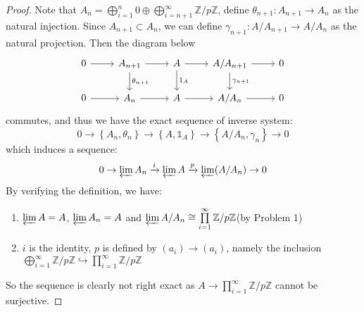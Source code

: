 \documentclass{solution}
\begin{document}
\begin{proof}
    Note that $A_n = \bigoplus\limits_{i = 1}^{n} 0 \oplus \bigoplus\limits_{i = n + 1}^{\infty} \mathbb{Z} / p \mathbb{Z}$, define $\theta_{n + 1}: A_{n + 1} \rightarrow A_n$ as the natural injection. Since $A_{n + 1} \subset A_n$, we can define $\gamma_{n + 1}: A / A_{n + 1} \rightarrow A / A_n$ as the natural projection. Then the diagram below
    \[\begin{tikzcd}
        0 & {A_{n + 1}} & A & {A / A_{n + 1}} & 0 \\
        0 & {A_n} & A & {A / A_n} & 0
        \arrow[from=1-1, to=1-2]
        \arrow[from=1-2, to=1-3]
        \arrow["{\theta_{n + 1}}", from=1-2, to=2-2]
        \arrow[from=1-3, to=1-4]
        \arrow["{1_A}", from=1-3, to=2-3]
        \arrow[from=1-4, to=1-5]
        \arrow["{\gamma_{n + 1}}", from=1-4, to=2-4]
        \arrow[from=2-1, to=2-2]
        \arrow[from=2-2, to=2-3]
        \arrow[from=2-3, to=2-4]
        \arrow[from=2-4, to=2-5]
    \end{tikzcd}\]
    commutes, and thus we have the exact sequence of inverse system:
    $$0 \rightarrow \left\lbrace A_n, \theta_n \right\rbrace \rightarrow \left\lbrace A, \mathds{1}_A \right\rbrace \rightarrow \left\lbrace A / A_n, \gamma_n \right\rbrace \rightarrow 0$$
    which induces a sequence:
    $$0 \rightarrow \varprojlim A_n \xrightarrow{i} \varprojlim A \xrightarrow{p} \varprojlim (A / A_n) \rightarrow 0$$
    By verifying the definition, we have:
    \begin{enumerate}
        \item $\varprojlim A = A$, $\varprojlim A_n = A$ and $\varprojlim A / A_n \cong \prod\limits_{i = 1}^{\infty} \mathbb{Z} / p \mathbb{Z}$(by Problem 1)
        \item $i$ is the identity, $p$ is defined by $(a_i) \rightarrow (a_i)$, namely the inclusion $\bigoplus\limits_{i = 1}^{\infty} \mathbb{Z} / p \mathbb{Z} \hookrightarrow \prod\limits_{i = 1}^{\infty} \mathbb{Z} / p \mathbb{Z}$
    \end{enumerate}
    So the sequence is clearly not right exact as $A \rightarrow \prod\limits_{i = 1}^{\infty} \mathbb{Z} / p \mathbb{Z}$ cannot be surjective.


\end{proof}
\end{document}
